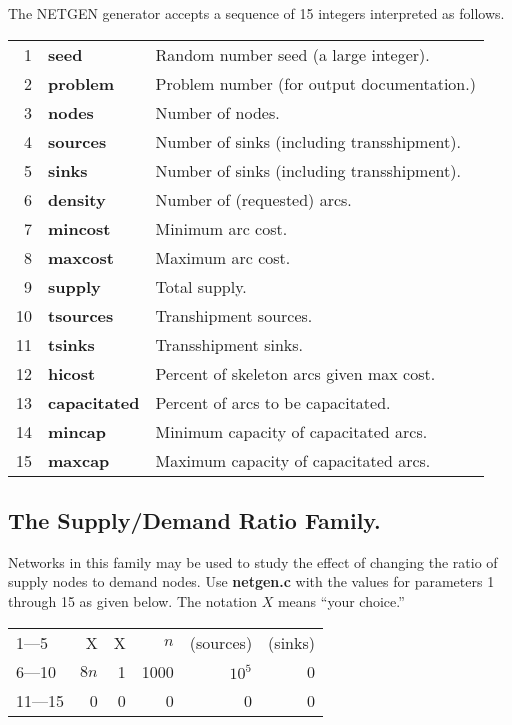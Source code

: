 The NETGEN generator accepts a sequence of 15 integers interpreted as
follows.
\vspace{.2in}

\begin{tabular}{rll} \hline 
1 & {\bf seed} & Random number seed (a large integer). \\ 2 & {\bf
problem} & Problem number (for output documentation.) \\ 3 & {\bf
nodes} & Number of nodes. \\ 4 & {\bf sources} & Number of sinks
(including transshipment). \\ 5 & {\bf sinks} & Number of sinks
(including transshipment). \\ 6 & {\bf density} & Number of
(requested) arcs. \\ 7 & {\bf mincost} & Minimum arc cost. \\ 8 & {\bf
maxcost} & Maximum arc cost. \\ 9 & {\bf supply} & Total supply. \\ 10
& {\bf tsources} & Transhipment sources. \\ 11 & {\bf tsinks } &
Transshipment sinks. \\ 12 & {\bf hicost } & Percent of skeleton arcs
given max cost. \\ 13 & {\bf capacitated} & Percent of arcs to be
capacitated. \\ 14 & {\bf mincap} & Minimum capacity of capacitated
arcs. \\ 15 & {\bf maxcap} & Maximum capacity of capacitated arcs. \\
\hline
\end{tabular} 

\subsection{The Supply/Demand Ratio Family.}

Networks in this family may be used to study the effect of changing
the ratio of supply nodes to demand nodes.  Use {\bf netgen.c} with
the values for parameters 1 through 15 as given below.  The notation
$X$ means ``your choice.''

\vspace{.2in} 
\begin{tabular}{|l|rrrrr|} \hline
1---5 & X & X & $n$ & (sources) & (sinks) \\ 
6---10 & $8n$ & 1 & 1000 & $10^5$ & 0 \\ 
11---15 & 0 & 0 & 0 & 0 & 0 \\ \hline
\end{tabular}

